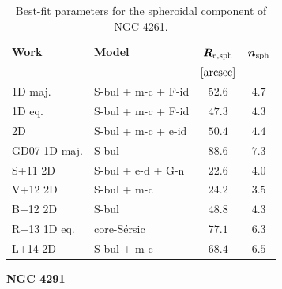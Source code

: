 \documentclass[preprint2]{emulateapj}
\begin{document}
  \begin{table}[h]
  \small
  \caption{Best-fit parameters for the spheroidal component of NGC 4261.}
  \begin{center}
  \begin{tabular}{llcc}
  \hline
  {\bf Work} & {\bf Model}   & $\bm R_{\rm e,sph}$    & $\bm n_{\rm sph}$ \\
    &  &  $[\rm arcsec]$ & \\
  \hline
  1D maj. & S-bul + m-c + F-id & $52.6$  &  $4.7$ \\
  1D eq.  & S-bul + m-c + F-id & $47.3$  &  $4.3$ \\
  2D      & S-bul + m-c + e-id & $50.4$  &  $4.4$ \\
  \hline
  GD07 1D maj.      & S-bul		& $88.6$  &  $7.3$ \\
  S+11 2D      & S-bul + e-d + G-n & $22.6$  &  $4.0$ \\
  V+12 2D      & S-bul + m-c	& $24.2$  &  $3.5$ \\
  B+12 2D      & S-bul		& $48.8$  &  $4.3$ \\
  R+13 1D eq.      & core-S\'ersic	& $77.1$  &  $6.3$ \\
  L+14 2D      & S-bul + m-c	& $68.4$  &  $6.5$ \\
  \hline
  \end{tabular}
  \end{center}
  \label{tab:n4261}
  \end{table}

  \clearpage\newpage\noindent
  {\bf NGC 4291 \\}
\end{document}
